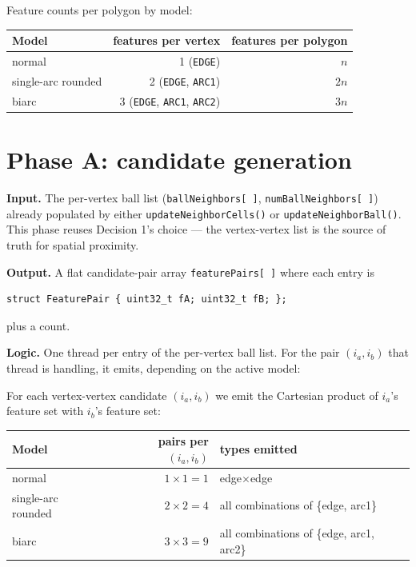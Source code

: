 \documentclass[11pt]{article}
\newcommand{\code}[1]{\texttt{#1}}
\begin{document}
Feature counts per polygon by model:
\begin{center}
\begin{tabular}{lrr}
  Model & features per vertex & features per polygon \\
  \hline
  normal             & 1 (\code{EDGE})                          & $n$  \\
  single-arc rounded & 2 (\code{EDGE}, \code{ARC1})             & $2n$ \\
  biarc              & 3 (\code{EDGE}, \code{ARC1}, \code{ARC2})& $3n$ \\
\end{tabular}
\end{center}

\section{Phase A: candidate generation}\label{sec:phaseA}

\textbf{Input.} The per-vertex ball list
(\code{ballNeighbors[\,]}, \code{numBallNeighbors[\,]}) already
populated by either \code{updateNeighborCells()} or
\code{updateNeighborBall()}. This phase reuses Decision 1's choice ---
the vertex-vertex list is the source of truth for spatial proximity.

\textbf{Output.} A flat candidate-pair array
\code{featurePairs[\,]} where each entry is
\begin{lstlisting}
struct FeaturePair { uint32_t fA; uint32_t fB; };
\end{lstlisting}
plus a count.

\textbf{Logic.} One thread per entry of the per-vertex ball list. For
the pair $(i_a, i_b)$ that thread is handling, it emits, depending on
the active model:

For each vertex-vertex candidate $(i_a, i_b)$ we emit the Cartesian
product of $i_a$'s feature set with $i_b$'s feature set:

\begin{center}
\begin{tabular}{lrl}
  Model              & pairs per $(i_a, i_b)$ & types emitted \\
  \hline
  normal             & $1 \times 1 = 1$  & edge$\times$edge \\
  single-arc rounded & $2 \times 2 = 4$  & all combinations of \{edge, arc1\} \\
  biarc              & $3 \times 3 = 9$  & all combinations of \{edge, arc1, arc2\} \\
\end{tabular}
\end{center}
\end{document}
